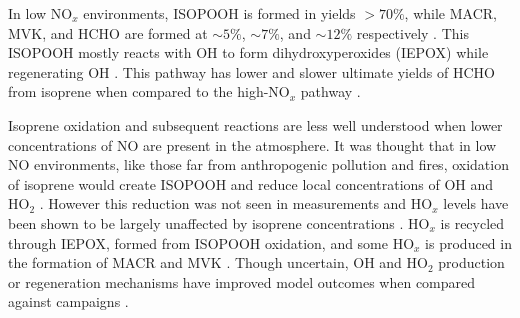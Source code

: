       In low NO$_x$ environments, ISOPOOH is formed in yields $> 70\%$, while MACR, MVK, and HCHO are formed at $\sim 5\%$, $\sim 7\%$, and $\sim 12\%$ respectively \parencite{Paulot2009b, Mao2013}.
      This ISOPOOH mostly reacts with OH to form dihydroxyperoxides (IEPOX) while regenerating OH \parencite{Mao2013}.
      This pathway has lower and slower ultimate yields of HCHO from isoprene 
      when compared to the high-NO$_x$ pathway \parencite{Palmer2006}.
      
      Isoprene oxidation and subsequent reactions are less well understood when lower concentrations of NO are present in the atmosphere.
      It was thought that in low NO environments, like those far from anthropogenic pollution and fires, oxidation of isoprene would create ISOPOOH and reduce local concentrations of OH and HO$_2$ \parencite{Guenther2000, Paulot2009b}.
      However this reduction was not seen in measurements and HO$_x$ levels 
      have been shown to be largely unaffected by isoprene concentrations 
      \parencite{Paulot2009b}.
      HO$_x$ is recycled through IEPOX, formed from ISOPOOH oxidation, and some HO$_x$ is produced in the formation of MACR and MVK \parencite{Paulot2009b}.
      Though uncertain, OH and HO$_2$ production or regeneration mechanisms have improved model outcomes when compared against campaigns \parencite{Peeters2010, Crounse2012}.
      
